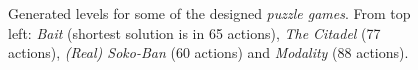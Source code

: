 \documentclass[a4paper,titlepage,final]{report}
\begin{document}
\begin{figure}[!ht]
{    	}\\
	\hfill
	\\
    	\caption{Generated levels for some of the designed \textit{puzzle games}. From top left: \textit{Bait} (shortest solution is in 65 actions), \textit{The Citadel} (77 actions), \textit{(Real) Soko-Ban} (60 actions) and \textit{Modality} (88 actions).}
	\label{fig:designed_games_genlvls}
\end{figure}
\end{document}
